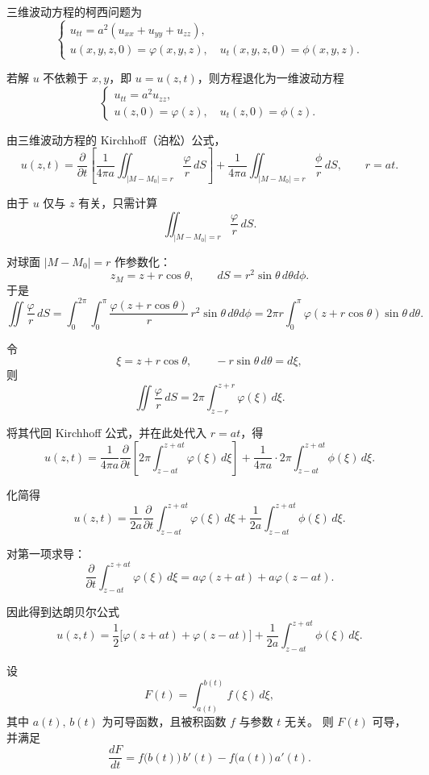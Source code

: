 \begin{solution}
三维波动方程的柯西问题为
\[
\begin{cases}
u_{tt}=a^{2}(u_{xx}+u_{yy}+u_{zz}),\\[3pt]
u(x,y,z,0)=\varphi(x,y,z),\quad
u_t(x,y,z,0)=\phi(x,y,z).
\end{cases}
\]

若解 $u$ 不依赖于 $x,y$，即 $u=u(z,t)$，则方程退化为一维波动方程
\[
\begin{cases}
u_{tt}=a^{2}u_{zz},\\[3pt]
u(z,0)=\varphi(z),\quad u_t(z,0)=\phi(z).
\end{cases}
\]

由三维波动方程的 Kirchhoff（泊松）公式，
\[
u(z,t)
=\frac{\partial}{\partial t}
\left[
\frac{1}{4\pi a}
\iint_{|M-M_0|=r}
\frac{\varphi}{r}\, dS
\right]
+
\frac{1}{4\pi a}
\iint_{|M-M_0|=r} \frac{\phi}{r}\, dS,
\qquad r=at.
\]

由于 $u$ 仅与 $z$ 有关，只需计算
\[
\iint_{|M-M_0|=r} \frac{\varphi}{r}\, dS.
\]

对球面 $|M-M_0|=r$ 作参数化：
\[
z_M = z + r\cos\theta,
\qquad
dS = r^{2}\sin\theta\, d\theta d\phi.
\]
于是
\[
\iint \frac{\varphi}{r}\, dS
=
\int_{0}^{2\pi}\!\int_{0}^{\pi}
\frac{\varphi(z+r\cos\theta)}{r}\,
r^{2}\sin\theta\, d\theta d\phi
=
2\pi r\int_{0}^{\pi}
\varphi(z+r\cos\theta)\sin\theta\, d\theta.
\]

令
\[
\xi=z+r\cos\theta,
\qquad
-r\sin\theta\, d\theta=d\xi,
\]
则
\[
\iint \frac{\varphi}{r}\, dS
=
2\pi\int_{z-r}^{z+r}\varphi(\xi)\, d\xi.
\]

将其代回 Kirchhoff 公式，并在此处代入 $r=at$，得
\[
u(z,t)
=
\frac{1}{4\pi a}
\frac{\partial}{\partial t}
\left[
2\pi\int_{z-at}^{z+at}\varphi(\xi)\, d\xi
\right]
+
\frac{1}{4\pi a}
\cdot
2\pi\int_{z-at}^{z+at}\phi(\xi)\, d\xi.
\]

化简得
\[
u(z,t)
=
\frac{1}{2a}
\frac{\partial}{\partial t}
\int_{z-at}^{z+at}\varphi(\xi)\, d\xi
+
\frac{1}{2a}
\int_{z-at}^{z+at}\phi(\xi)\, d\xi.
\]

对第一项求导：
\[
\frac{\partial}{\partial t}
\int_{z-at}^{z+at}\varphi(\xi)\, d\xi
=
a\varphi(z+at)+a\varphi(z-at).
\]

因此得到达朗贝尔公式
\[
\boxed{
u(z,t)
=
\frac12\bigl[\varphi(z+at)+\varphi(z-at)\bigr]
+
\frac{1}{2a}\int_{z-at}^{z+at}\phi(\xi)\, d\xi.
}
\]
\end{solution}
\begin{definition}
设
\[
F(t)=\int_{a(t)}^{b(t)} f(\xi)\,d\xi,
\]
其中 $a(t),\,b(t)$ 为可导函数，且被积函数 $f$ 与参数 $t$ 无关。
则 $F(t)$ 可导，并满足
\[
\frac{dF}{dt}
=
f\bigl(b(t)\bigr)\,b'(t)
-
f\bigl(a(t)\bigr)\,a'(t).
\]
\end{definition}

